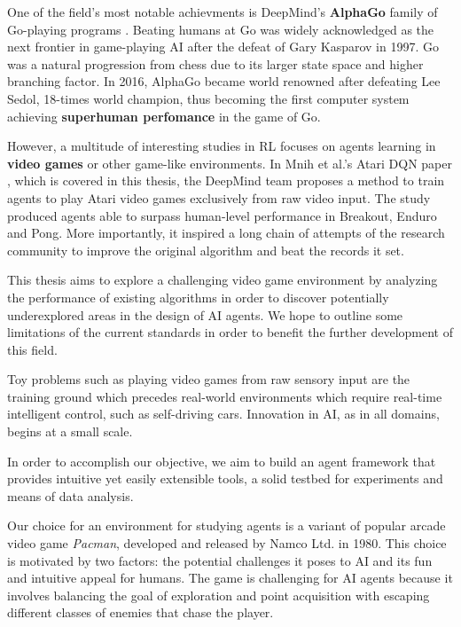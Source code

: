 \documentclass[12pt,twoside]{report}
\begin{document}
One of the field's most notable achievments is DeepMind's \textbf{AlphaGo} family of Go-playing programs \cite{ago, alpha-zero}.
Beating humans at Go was widely acknowledged as the next frontier in game-playing AI after the defeat of Gary Kasparov in 1997\footnotemark.
Go was a natural progression from chess due to its larger state space and higher branching factor.
In 2016, AlphaGo became world renowned after defeating Lee Sedol, 18-times world champion, thus becoming the first computer system achieving \textbf{superhuman perfomance} in the game of Go.

However, a multitude of interesting studies in RL focuses on agents learning in \textbf{video games} or other game-like environments.
In Mnih et al.'s Atari DQN paper \cite{atari-dqn}, which is covered in this thesis, the DeepMind team proposes a method to train agents to play Atari video games exclusively from raw video input.
The study produced agents able to surpass human-level performance in Breakout, Enduro and Pong.
More importantly, it inspired a long chain of attempts of the research community to improve the original algorithm and beat the records it set.

This thesis aims to explore a challenging video game environment by analyzing the performance of existing algorithms in order to discover potentially underexplored areas in the design of AI agents.
We hope to outline some limitations of the current standards in order to benefit the further development of this field.

Toy problems such as playing video games from raw sensory input are the training ground which precedes real-world environments which require real-time intelligent control, such as self-driving cars.
Innovation in AI, as in all domains, begins at a small scale.

In order to accomplish our objective, we aim to build an agent framework that provides intuitive yet easily extensible tools, a solid testbed for experiments and means of data analysis.

Our choice for an environment for studying agents is a variant of popular arcade video game \emph{Pacman}, developed and released by Namco Ltd. in 1980.
This choice is motivated by two factors: the potential challenges it poses to AI and its fun and intuitive appeal for humans.
The game is challenging for AI agents because it involves balancing the goal of exploration and point acquisition with escaping different classes of enemies that chase the player.
\end{document}
